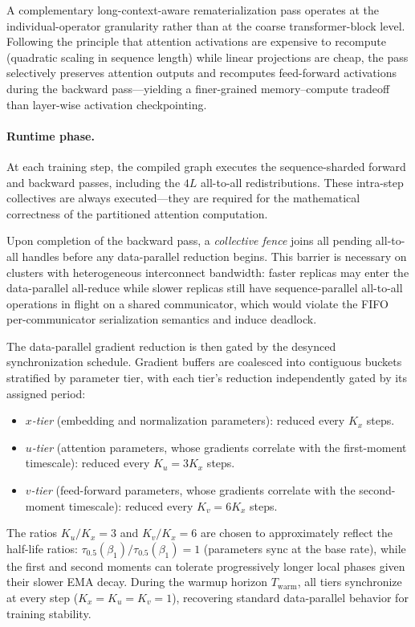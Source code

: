 \documentclass{article}
\begin{document}
A complementary long-context-aware rematerialization pass operates at
the individual-operator granularity rather than at the coarse
transformer-block level. Following the principle that attention activations
are expensive to recompute (quadratic scaling in sequence length) while
linear projections are cheap, the pass selectively preserves attention
outputs and recomputes feed-forward activations during the backward
pass---yielding a finer-grained memory--compute tradeoff than
layer-wise activation checkpointing.

\paragraph{Runtime phase.}
At each training step, the compiled graph executes the sequence-sharded
forward and backward passes, including the $4L$ all-to-all redistributions.
These intra-step collectives are always executed---they are required for
the mathematical correctness of the partitioned attention computation.

Upon completion of the backward pass, a \emph{collective fence} joins all
pending all-to-all handles before any data-parallel reduction begins.
This barrier is necessary on clusters with heterogeneous interconnect
bandwidth: faster replicas may enter the data-parallel all-reduce while
slower replicas still have sequence-parallel all-to-all operations
in flight on a shared communicator, which would violate the FIFO
per-communicator serialization semantics and induce deadlock.

The data-parallel gradient reduction is then gated by the desynced
synchronization schedule. Gradient buffers are coalesced into contiguous
buckets stratified by parameter tier, with each tier's reduction
independently gated by its assigned period:
\begin{itemize}[nosep,leftmargin=*]
\item \emph{$x$-tier} (embedding and normalization parameters): reduced
  every $K_x$ steps.
\item \emph{$u$-tier} (attention parameters, whose gradients correlate
  with the first-moment timescale): reduced every $K_u = 3K_x$ steps.
\item \emph{$v$-tier} (feed-forward parameters, whose gradients correlate
  with the second-moment timescale): reduced every $K_v = 6K_x$ steps.
\end{itemize}
The ratios $K_u/K_x = 3$ and $K_v/K_x = 6$ are chosen to approximately
reflect the half-life ratios: $\tau_{0.5}(\beta_1)/\tau_{0.5}(\beta_1)
= 1$ (parameters sync at the base rate), while the first and second
moments can tolerate progressively longer local phases given their
slower EMA decay. During the warmup horizon $T_{\mathrm{warm}}$, all
tiers synchronize at every step ($K_x = K_u = K_v = 1$), recovering
standard data-parallel behavior for training stability.
\end{document}
